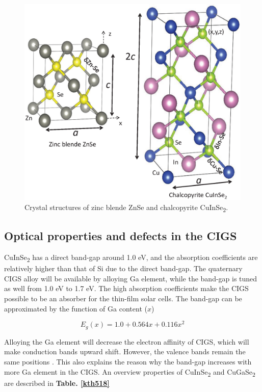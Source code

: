 \documentclass[a4paper, 12pt, titlepage,oneside,drop]{kthesis}
\begin{document}
\begin{figure}[H]
\centering
\includegraphics[scale=0.4]{structureciise.eps} 
\caption{Crystal structures of zinc blende ZnSe and chalcopyrite CuInSe\textsubscript{2}.}
\label{crystal_cigs}
\end{figure}


\subsection{Optical properties and defects in the CIGS}
CuInSe\textsubscript{2} has a direct band-gap around 1.0 eV, and the absorption coefficients are relatively higher than that of Si due to the direct band-gap. The quaternary CIGS alloy will be available by alloying Ga element, while the band-gap is tuned as well from 
1.0 eV to 1.7 eV. The high absorption coefficients make the CIGS possible to be an absorber for the thin-film solar cells. The band-gap can be approximated by the function of Ga content ($x$) \cite{luque2011handbook}

\begin{equation}
E_g(x) = 1.0 + 0.564x+0.116x^2
\end{equation}

Alloying the Ga element will decrease the electron affinity of CIGS, which will make conduction bands upward shift. However, the valence bands remain the same positions \cite{jiang2004does}. This also explains the reason why the band-gap increases with 
more Ga element in the CIGS. An overview properties of CuInSe\textsubscript{2} and CuGaSe\textsubscript{2} are described in \textbf{Table. \ref{kth518}} 
\end{document}
